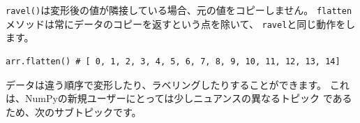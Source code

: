 \documentclass{jsarticle}
\begin{document}
            \verb|ravel()|は変形後の値が隣接している場合、元の値をコピーしません。
            \verb|flatten|メソッドは常にデータのコピーを返すという点を除いて、
            \verb|ravel|と同じ動作をします。

            \begin{lstlisting}
arr.flatten() # [ 0, 1, 2, 3, 4, 5, 6, 7, 8, 9, 10, 11, 12, 13, 14]\end{lstlisting}

            データは違う順序で変形したり、ラベリングしたりすることができます。
            これは、NumPyの新規ユーザーにとっては少しニュアンスの異なるトピック
            であるため、次のサブトピックです。
\end{document}
